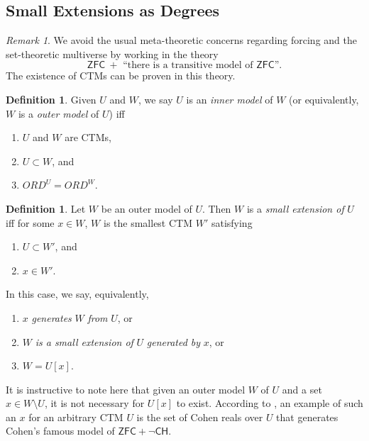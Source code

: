 \documentclass[12pt, twoside]{memoir}
\numberwithin{equation}{section}
\theoremstyle{definition}
\newtheorem{defi}[thm]{Definition}
\theoremstyle{remark}
\newtheorem{rem}[thm]{Remark}
\theoremstyle{definition}
\theoremstyle{definition}
\theoremstyle{definition}
\theoremstyle{remark}
\begin{document}
\subsection{Small Extensions as Degrees}

\begin{rem}
We avoid the usual meta-theoretic concerns regarding forcing and the set-theoretic multiverse by working in the theory 
\begin{equation*}
    \mathsf{ZFC} \ + \text{ ``there is a transitive model of } \mathsf{ZFC}\text{''.}
\end{equation*} 
The existence of CTMs can be proven in this theory.
\end{rem}

\begin{defi}
Given $U$ and $W$, we say $U$ is an \emph{inner model} of $W$ (or equivalently, $W$ is a \emph{outer model} of $U$) iff
\begin{enumerate}[label=(\alph*)]
    \item $U$ and $W$ are CTMs,
    \item $U \subset W$, and
    \item $ORD^U = ORD^W$.
\end{enumerate}
\end{defi}

\begin{defi}\label{def913}
Let $W$ be an outer model of $U$. Then $W$ is a \emph{small extension of} $U$ iff for some $x \in W$, $W$ is the smallest CTM $W'$ satisfying
\begin{enumerate}[label=(\alph*)]
    \item $U \subset W'$, and
    \item $x \in W'$.
\end{enumerate}
In this case, we say, equivalently,
\begin{enumerate}[label=(\arabic*)]
    \item $x$ \emph{generates} $W$ \emph{from} $U$, or
    \item $W$ \emph{is a small extension of} $U$ \emph{generated by} $x$, or
    \item $W = U[x]$.
\end{enumerate}
\end{defi}

It is instructive to note here that given an outer model $W$ of $U$ and a set $x \in W \setminus U$, it is not necessary for $U[x]$ to exist. According to \cite{ciesielski}, an example of such an $x$ for an arbitrary CTM $U$ is the set of Cohen reals over $U$ that generates Cohen's famous model of $\mathsf{ZFC} + \neg \mathsf{CH}$. 
\end{document}
